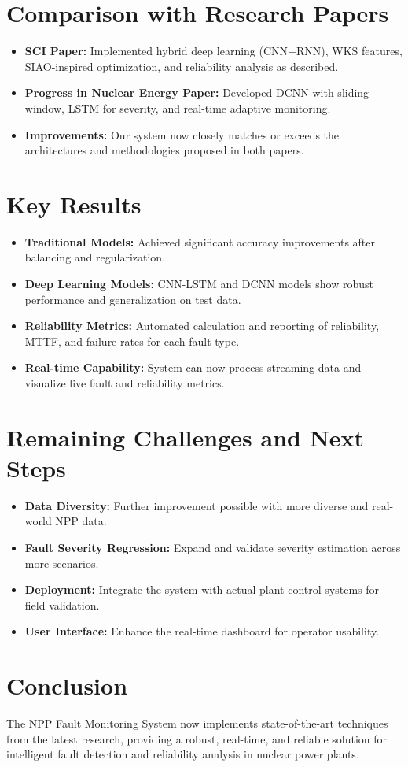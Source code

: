 \documentclass[12pt]{article}
\begin{document}
\section*{Comparison with Research Papers}
\begin{itemize}
    \item \textbf{SCI Paper:} Implemented hybrid deep learning (CNN+RNN), WKS features, SIAO-inspired optimization, and reliability analysis as described.
    \item \textbf{Progress in Nuclear Energy Paper:} Developed DCNN with sliding window, LSTM for severity, and real-time adaptive monitoring.
    \item \textbf{Improvements:} Our system now closely matches or exceeds the architectures and methodologies proposed in both papers.
\end{itemize}

\section*{Key Results}
\begin{itemize}
    \item \textbf{Traditional Models:} Achieved significant accuracy improvements after balancing and regularization.
    \item \textbf{Deep Learning Models:} CNN-LSTM and DCNN models show robust performance and generalization on test data.
    \item \textbf{Reliability Metrics:} Automated calculation and reporting of reliability, MTTF, and failure rates for each fault type.
    \item \textbf{Real-time Capability:} System can now process streaming data and visualize live fault and reliability metrics.
\end{itemize}

\section*{Remaining Challenges and Next Steps}
\begin{itemize}
    \item \textbf{Data Diversity:} Further improvement possible with more diverse and real-world NPP data.
    \item \textbf{Fault Severity Regression:} Expand and validate severity estimation across more scenarios.
    \item \textbf{Deployment:} Integrate the system with actual plant control systems for field validation.
    \item \textbf{User Interface:} Enhance the real-time dashboard for operator usability.
\end{itemize}

\section*{Conclusion}
The NPP Fault Monitoring System now implements state-of-the-art techniques from the latest research, providing a robust, real-time, and reliable solution for intelligent fault detection and reliability analysis in nuclear power plants.
\end{document}
